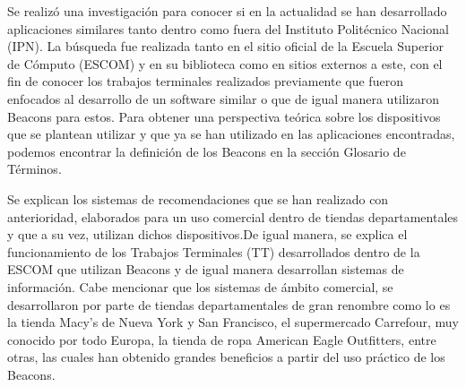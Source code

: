 Se realizó una investigación para conocer si en la actualidad se han desarrollado aplicaciones similares tanto dentro como fuera del Instituto Politécnico Nacional (IPN). La búsqueda fue realizada tanto en el sitio oficial de la Escuela Superior de Cómputo (ESCOM) y en su biblioteca como en sitios externos a este, con el fin de conocer los trabajos terminales realizados previamente que fueron enfocados al desarrollo de un software similar o que de igual manera utilizaron Beacons para estos.
Para obtener una perspectiva teórica sobre los dispositivos que se plantean utilizar y que ya se han utilizado en las aplicaciones encontradas, podemos encontrar la definición de los Beacons en la sección Glosario de Términos.
\\ \par
Se explican los sistemas de recomendaciones que se han realizado con anterioridad, elaborados para un uso comercial dentro de tiendas departamentales y que a su vez, utilizan dichos dispositivos.De igual manera, se explica el funcionamiento de los Trabajos Terminales (TT) desarrollados dentro de la ESCOM que utilizan Beacons y de igual manera desarrollan sistemas de información. Cabe mencionar que los sistemas de ámbito comercial, se desarrollaron por parte de tiendas departamentales de gran renombre como lo es la tienda Macy's de Nueva York y San Francisco, el supermercado Carrefour, muy conocido por todo Europa, la tienda de ropa American Eagle Outfitters, entre otras, las cuales han obtenido grandes beneficios a partir del uso práctico de los Beacons.
\\ \par
